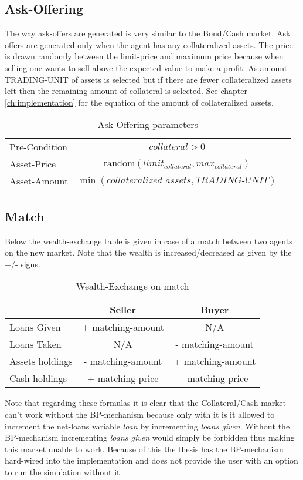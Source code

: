 \documentclass[Bachelorarbeit.tex]{subfiles}
\begin{document}
\subsection{Ask-Offering}
The way ask-offers are generated is very similar to the Bond/Cash market. Ask offers are generated only when the agent has any collateralized assets. The price is drawn randomly between the limit-price and maximum price because when selling one wants to sell above the expected value to make a profit. As amount TRADING-UNIT of assets is selected but if there are fewer collateralized assets left then the remaining amount of collateral is selected. See chapter \ref{ch:implementation} for the equation of the amount of collateralized assets.

\begin{table}[H]
	\centering
	\caption{Ask-Offering parameters}
	\begin{tabular} { l c r }
		\hline
		Pre-Condition & $\textit{collateral} > 0$  \\
		Asset-Price & $\mathrm{random}(limit_{collateral}, max_{collateral})$ \\
		Asset-Amount & $\min ( { \textit{collateralized assets} }, \textit{TRADING-UNIT} )$ \\
		\hline
	\end{tabular}
\end{table}

\subsection{Match}
Below the wealth-exchange table is given in case of a match between two agents on the new market. Note that the wealth is increased/decreased as given by the +/- signs.

\begin{table}[H]
	\centering
	\caption{Wealth-Exchange on match}
	\begin{tabular} { l c c }
		& Seller & Buyer \\
		\hline
		Loans Given & + matching-amount & N/A \\
		Loans Taken & N/A & - matching-amount \\
		Assets holdings & - matching-amount & + matching-amount \\
		Cash holdings  & + matching-price & - matching-price \\
		\hline
	\end{tabular}
\end{table}

Note that regarding these formulas it is clear that the Collateral/Cash market can't work without the BP-mechanism because only with it is it allowed to increment the net-loans variable \textit{loan} by incrementing \textit{loans given}. Without the BP-mechanism incrementing \textit{loans given} would simply be forbidden thus making this market unable to work. Because of this the thesis has the BP-mechanism hard-wired into the implementation and does not provide the user with an option to run the simulation without it.
\end{document}
